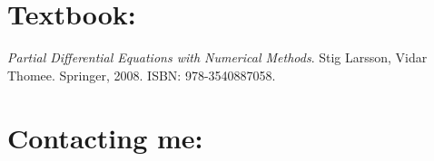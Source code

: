 \documentclass[margin]{res}
\theoremstyle{plain}
\theoremstyle{definition}
\theoremstyle{remark}
\begin{document}
\begin{resume}

\section{Textbook:}  \textit{Partial Differential Equations with Numerical Methods}.  Stig Larsson, Vidar Thomee.  Springer, 2008. ISBN: 978-3540887058.


% 


\section{Contacting me:}


\end{resume}
\end{document}
